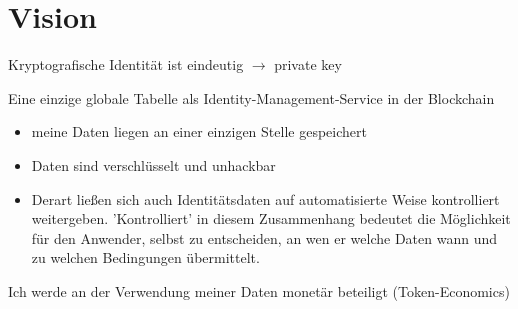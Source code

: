 \section{Vision}
\label{sec:vision}


\vspace{0.3cm}


\vspace{0.3cm}

\begin{Solution}

Kryptografische Identität ist eindeutig $\rightarrow$ private key

\end{Solution}

\vspace{0.3cm}


\begin{Solution}

Eine einzige globale Tabelle als Identity-Management-Service in der Blockchain

\end{Solution}

\vspace{0.3cm}


\begin{Solution}[Datenschutz]

\begin{itemize}
  \item meine Daten liegen an einer einzigen Stelle gespeichert
  \item Daten sind verschlüsselt und unhackbar
  \item Derart ließen sich auch Identitätsdaten auf automatisierte Weise kontrolliert weitergeben. 'Kontrolliert' in diesem Zusammenhang bedeutet die Möglichkeit für den Anwender, selbst zu entscheiden, an wen er welche Daten wann und zu welchen Bedingungen übermittelt.
\end{itemize}

\end{Solution}

\vspace{0.3cm}


\begin{Solution}

Ich werde an der Verwendung meiner Daten monetär beteiligt (Token-Economics)

\end{Solution}

